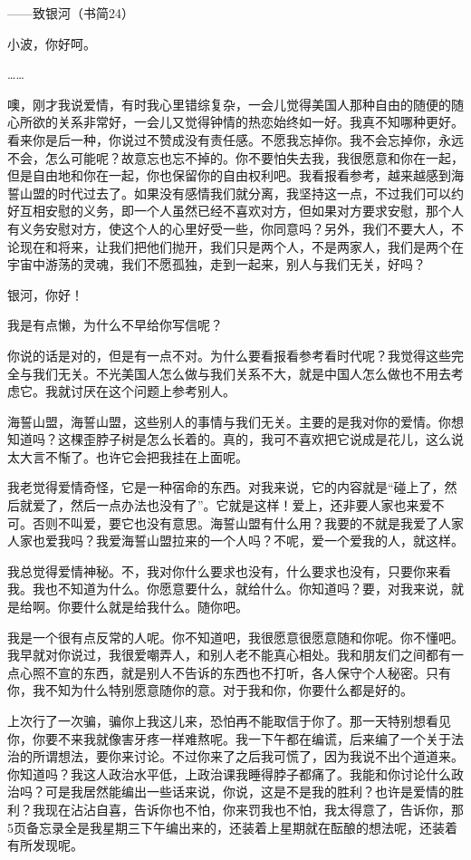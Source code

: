 ——致银河（书简24） 

小波，你好呵。 

…… 

噢，刚才我说爱情，有时我心里错综复杂，一会儿觉得美国人那种自由的随便的随心所欲的关系非常好，一会儿又觉得钟情的热恋始终如一好。我真不知哪种更好。看来你是后一种，你说过不赞成没有责任感。不愿我忘掉你。我不会忘掉你，永远不会，怎么可能呢？故意忘也忘不掉的。你不要怕失去我，我很愿意和你在一起，但是自由地和你在一起，你也保留你的自由权利吧。我看报看参考，越来越感到海誓山盟的时代过去了。如果没有感情我们就分离，我坚持这一点，不过我们可以约好互相安慰的义务，即一个人虽然已经不喜欢对方，但如果对方要求安慰，那个人有义务安慰对方，使这个人的心里好受一些，你同意吗？另外，我们不要大人，不论现在和将来，让我们把他们抛开，我们只是两个人，不是两家人，我们是两个在宇宙中游荡的灵魂，我们不愿孤独，走到一起来，别人与我们无关，好吗？ 

银河，你好！ 

我是有点懒，为什么不早给你写信呢？ 

你说的话是对的，但是有一点不对。为什么要看报看参考看时代呢？我觉得这些完全与我们无关。不光美国人怎么做与我们关系不大，就是中国人怎么做也不用去考虑它。我就讨厌在这个问题上参考别人。 

海誓山盟，海誓山盟，这些别人的事情与我们无关。主要的是我对你的爱情。你想知道吗？这棵歪脖子树是怎么长着的。真的，我可不喜欢把它说成是花儿，这么说太大言不惭了。也许它会把我挂在上面呢。 

我老觉得爱情奇怪，它是一种宿命的东西。对我来说，它的内容就是“碰上了，然后就爱了，然后一点办法也没有了”。它就是这样！爱上，还非要人家也来爱不可。否则不叫爱，要它也没有意思。海誓山盟有什么用？我要的不就是我爱了人家人家也爱我吗？我爱海誓山盟拉来的一个人吗？不呢，爱一个爱我的人，就这样。 

我总觉得爱情神秘。不，我对你什么要求也没有，什么要求也没有，只要你来看我。我也不知道为什么。你愿意要什么，就给什么。你知道吗？要，对我来说，就是给啊。你要什么就是给我什么。随你吧。 

我是一个很有点反常的人呢。你不知道吧，我很愿意很愿意随和你呢。你不懂吧。我早就对你说过，我很爱嘲弄人，和别人老不能真心相处。我和朋友们之间都有一点心照不宣的东西，就是别人不告诉的东西也不打听，各人保守个人秘密。只有你，我不知为什么特别愿意随你的意。对于我和你，你要什么都是好的。 

上次行了一次骗，骗你上我这儿来，恐怕再不能取信于你了。那一天特别想看见你，你要不来我就像害牙疼一样难熬呢。我一下午都在编谎，后来编了一个关于法治的所谓想法，要你来讨论。不过你来了之后我可慌了，因为我说不出个道道来。你知道吗？我这人政治水平低，上政治课我睡得脖子都痛了。我能和你讨论什么政治吗？可是我居然能编出一些话来说，你说，这是不是我的胜利？也许是爱情的胜利？我现在沾沾自喜，告诉你也不怕，你来罚我也不怕，我太得意了，告诉你，那5页备忘录全是我星期三下午编出来的，还装着上星期就在酝酿的想法呢，还装着有所发现呢。 

